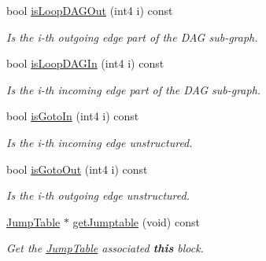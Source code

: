 \begin{DoxyCompactItemize}
bool \mbox{\hyperlink{class_flow_block_a82b1e9b66bef1b34d2f5136b61cadbe9}{is\+Loop\+D\+A\+G\+Out}} (int4 i) const
\begin{DoxyCompactList}\small\item\em Is the i-\/th outgoing edge part of the D\+AG sub-\/graph. \end{DoxyCompactList}\item 
bool \mbox{\hyperlink{class_flow_block_a31db534d506fdf721189b553f869cd33}{is\+Loop\+D\+A\+G\+In}} (int4 i) const
\begin{DoxyCompactList}\small\item\em Is the i-\/th incoming edge part of the D\+AG sub-\/graph. \end{DoxyCompactList}\item 
bool \mbox{\hyperlink{class_flow_block_aabe712161d0f64bcf0a8f98329b19419}{is\+Goto\+In}} (int4 i) const
\begin{DoxyCompactList}\small\item\em Is the i-\/th incoming edge unstructured. \end{DoxyCompactList}\item 
bool \mbox{\hyperlink{class_flow_block_a338b6b77d5b3e19d7393cc0e8baf5f26}{is\+Goto\+Out}} (int4 i) const
\begin{DoxyCompactList}\small\item\em Is the i-\/th outgoing edge unstructured. \end{DoxyCompactList}\item 
\mbox{\hyperlink{class_jump_table}{Jump\+Table}} $\ast$ \mbox{\hyperlink{class_flow_block_a6791d31146a1bb676caa165ad5950c2d}{get\+Jumptable}} (void) const
\begin{DoxyCompactList}\small\item\em Get the \mbox{\hyperlink{class_jump_table}{Jump\+Table}} associated {\bfseries{this}} block. \end{DoxyCompactList}\end{DoxyCompactItemize}
